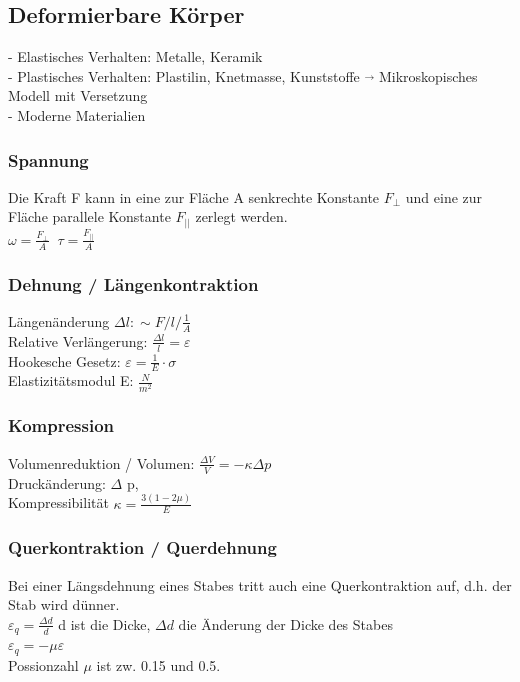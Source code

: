 \subsection{Deformierbare Körper}
- Elastisches Verhalten: Metalle, Keramik \\
- Plastisches  Verhalten: Plastilin, Knetmasse, Kunststoffe $\overrightarrow{}$ Mikroskopisches Modell mit Versetzung \\
- Moderne Materialien

\begin{multicols}{2}
\subsubsection{Spannung}
Die Kraft F kann in eine zur Fläche A senkrechte Konstante $F_{\perp}$ und eine zur Fläche parallele Konstante $F_{||}$ zerlegt werden.  \\
$\omega = \frac{F_{\perp}}{A} \; \; \tau = \frac{F_{||}}{A}$

\subsubsection{Dehnung / Längenkontraktion}
 Längenänderung $\Delta l:  \sim F / l / \frac{1}{A}$ \\
 Relative Verlängerung: $\frac{\Delta l}{l} = \varepsilon$ \\
Hookesche Gesetz: $ \varepsilon = \frac{1}{E} \cdot \sigma $ \\
Elastizitätsmodul E: \lbrack$ \frac{N}{m^2}$ \rbrack

\subsubsection{Kompression}

Volumenreduktion / Volumen: $\frac{\Delta V}{V} = - \kappa \Delta p$\\
Druckänderung: $\Delta$ p, \\
Kompressibilität $\kappa = \frac{3(1-2\mu)}{E}$


\subsubsection{Querkontraktion / Querdehnung}
Bei einer Längsdehnung eines Stabes tritt auch eine Querkontraktion auf, d.h. der Stab wird dünner. \\
$ \varepsilon_{q} = \frac{\Delta d}{d}$ d ist die Dicke, $\Delta d$ die Änderung der Dicke des Stabes \\
$\varepsilon_{q} = -\mu \varepsilon $ \\
Possionzahl $\mu$ ist zw. 0.15 und 0.5. 


\end{multicols}

